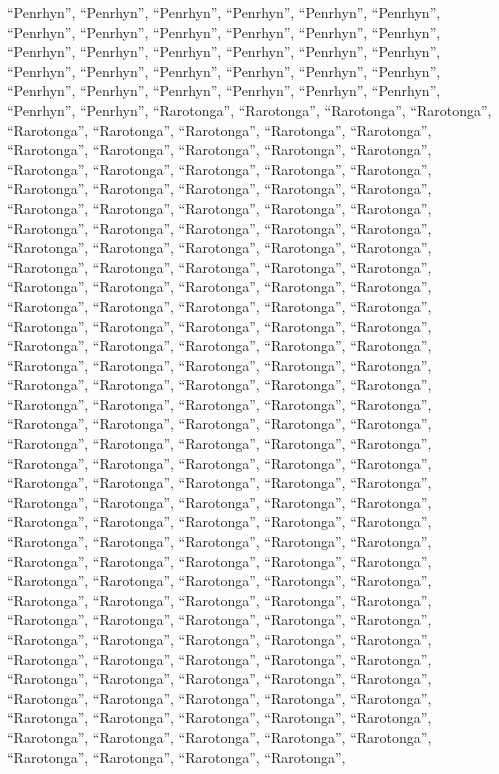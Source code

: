 \documentclass[
  ,man]{apa6}
\begin{document}
``Penrhyn'', ``Penrhyn'', ``Penrhyn'', ``Penrhyn'', ``Penrhyn'', ``Penrhyn'', ``Penrhyn'', ``Penrhyn'', ``Penrhyn'', ``Penrhyn'', ``Penrhyn'', ``Penrhyn'', ``Penrhyn'', ``Penrhyn'', ``Penrhyn'', ``Penrhyn'', ``Penrhyn'', ``Penrhyn'', ``Penrhyn'', ``Penrhyn'', ``Penrhyn'', ``Penrhyn'', ``Penrhyn'', ``Penrhyn'', ``Penrhyn'', ``Penrhyn'', ``Penrhyn'', ``Penrhyn'', ``Penrhyn'', ``Penrhyn'', ``Penrhyn'', ``Penrhyn'', ``Rarotonga'', ``Rarotonga'', ``Rarotonga'', ``Rarotonga'', ``Rarotonga'', ``Rarotonga'', ``Rarotonga'', ``Rarotonga'', ``Rarotonga'', ``Rarotonga'', ``Rarotonga'', ``Rarotonga'',
``Rarotonga'', ``Rarotonga'', ``Rarotonga'', ``Rarotonga'', ``Rarotonga'', ``Rarotonga'', ``Rarotonga'', ``Rarotonga'', ``Rarotonga'', ``Rarotonga'', ``Rarotonga'', ``Rarotonga'', ``Rarotonga'', ``Rarotonga'', ``Rarotonga'', ``Rarotonga'', ``Rarotonga'', ``Rarotonga'', ``Rarotonga'', ``Rarotonga'', ``Rarotonga'', ``Rarotonga'', ``Rarotonga'', ``Rarotonga'', ``Rarotonga'', ``Rarotonga'', ``Rarotonga'', ``Rarotonga'', ``Rarotonga'', ``Rarotonga'', ``Rarotonga'', ``Rarotonga'', ``Rarotonga'', ``Rarotonga'', ``Rarotonga'', ``Rarotonga'', ``Rarotonga'', ``Rarotonga'', ``Rarotonga'',
``Rarotonga'', ``Rarotonga'', ``Rarotonga'', ``Rarotonga'', ``Rarotonga'', ``Rarotonga'', ``Rarotonga'', ``Rarotonga'', ``Rarotonga'', ``Rarotonga'', ``Rarotonga'', ``Rarotonga'', ``Rarotonga'', ``Rarotonga'', ``Rarotonga'', ``Rarotonga'', ``Rarotonga'', ``Rarotonga'', ``Rarotonga'', ``Rarotonga'', ``Rarotonga'', ``Rarotonga'', ``Rarotonga'', ``Rarotonga'', ``Rarotonga'', ``Rarotonga'', ``Rarotonga'', ``Rarotonga'', ``Rarotonga'', ``Rarotonga'', ``Rarotonga'', ``Rarotonga'', ``Rarotonga'', ``Rarotonga'', ``Rarotonga'', ``Rarotonga'', ``Rarotonga'', ``Rarotonga'', ``Rarotonga'',
``Rarotonga'', ``Rarotonga'', ``Rarotonga'', ``Rarotonga'', ``Rarotonga'', ``Rarotonga'', ``Rarotonga'', ``Rarotonga'', ``Rarotonga'', ``Rarotonga'', ``Rarotonga'', ``Rarotonga'', ``Rarotonga'', ``Rarotonga'', ``Rarotonga'', ``Rarotonga'', ``Rarotonga'', ``Rarotonga'', ``Rarotonga'', ``Rarotonga'', ``Rarotonga'', ``Rarotonga'', ``Rarotonga'', ``Rarotonga'', ``Rarotonga'', ``Rarotonga'', ``Rarotonga'', ``Rarotonga'', ``Rarotonga'', ``Rarotonga'', ``Rarotonga'', ``Rarotonga'', ``Rarotonga'', ``Rarotonga'', ``Rarotonga'', ``Rarotonga'', ``Rarotonga'', ``Rarotonga'', ``Rarotonga'',
``Rarotonga'', ``Rarotonga'', ``Rarotonga'', ``Rarotonga'', ``Rarotonga'', ``Rarotonga'', ``Rarotonga'', ``Rarotonga'', ``Rarotonga'', ``Rarotonga'', ``Rarotonga'', ``Rarotonga'', ``Rarotonga'', ``Rarotonga'', ``Rarotonga'', ``Rarotonga'', ``Rarotonga'', ``Rarotonga'', ``Rarotonga'', ``Rarotonga'', ``Rarotonga'', ``Rarotonga'', ``Rarotonga'', ``Rarotonga'', ``Rarotonga'', ``Rarotonga'', ``Rarotonga'', ``Rarotonga'', ``Rarotonga'', ``Rarotonga'', ``Rarotonga'', ``Rarotonga'', ``Rarotonga'', ``Rarotonga'', ``Rarotonga'', ``Rarotonga'', ``Rarotonga'', ``Rarotonga'', ``Rarotonga'',
\end{document}
